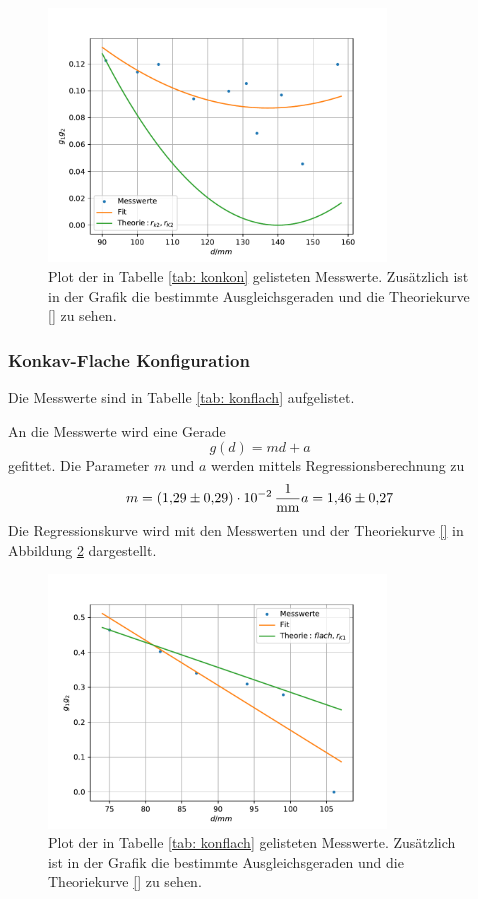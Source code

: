 \begin{figure}[h!]
  \centering
  \includegraphics[width=0.8\textwidth]{../Messdaten/plots/konkon.pdf}
  \caption{Plot der in Tabelle \ref{tab: konkon} gelisteten Messwerte. Zusätzlich ist in der Grafik die bestimmte Ausgleichsgeraden und die Theoriekurve \eqref{} zu sehen.}
  \label{fig: konkon}
\end{figure}


\subsubsection{Konkav-Flache Konfiguration}
Die Messwerte sind in Tabelle \ref{tab: konflach} aufgelistet.

An die Messwerte wird eine Gerade
\begin{equation*}
  g(d)=md+a
\end{equation*}
gefittet. Die Parameter $m$ und $a$ werden mittels Regressionsberechnung zu
\begin{align}
  \label{eq: konflach}
  \begin{aligned}
    m=\SI{1.29 \pm 0.29 e-2}{\per\milli\meter}
    a=\num{1.46\pm0.27}
  \end{aligned}
\end{align}
Die Regressionskurve wird mit den Messwerten und der Theoriekurve \eqref{} in Abbildung \ref{fig: konflach} dargestellt.

\begin{figure}[h!]
  \centering
  \includegraphics[width=0.8\textwidth]{../Messdaten/plots/konflach.pdf}
  \caption{Plot der in Tabelle \ref{tab: konflach} gelisteten Messwerte. Zusätzlich ist in der Grafik die bestimmte Ausgleichsgeraden und die Theoriekurve \eqref{} zu sehen.}
  \label{fig: konflach}
\end{figure}
